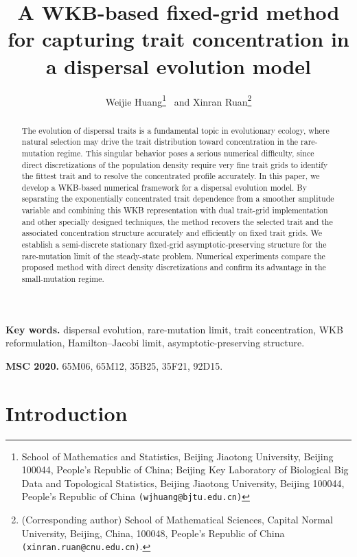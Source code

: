 \documentclass[11pt]{article}
\title{A WKB-based fixed-grid method for capturing trait concentration in a dispersal evolution model}
\author{
Weijie Huang\thanks{School of Mathematics and Statistics, Beijing Jiaotong University, Beijing 100044, People's Republic of China; Beijing Key Laboratory of Biological Big Data and Topological Statistics, Beijing Jiaotong University, Beijing 100044, People's Republic of China {\tt (wjhuang@bjtu.edu.cn)}} \ and
Xinran Ruan\thanks{(Corresponding author) School of Mathematical Sciences, Capital Normal University, Beijing, China, 100048, People's Republic of China {\tt (xinran.ruan@cnu.edu.cn)}.}
}
\numberwithin{equation}{section}
\begin{document}
\date{}
\maketitle

\begin{abstract}
The evolution of dispersal traits is a fundamental topic in evolutionary ecology, 
where natural selection may drive the trait distribution toward concentration in the rare-mutation regime. 
This singular behavior poses a serious numerical difficulty, 
since direct discretizations of the population density require very fine trait grids to identify the fittest trait and to resolve the concentrated profile accurately. 
In this paper, we develop a WKB-based numerical framework for a dispersal evolution model. 
By separating the exponentially concentrated trait dependence from a smoother
amplitude variable and combining this WKB representation with dual trait-grid implementation and other specially designed techniques, the method recovers the selected trait and
the associated concentration structure accurately and efficiently on fixed trait grids. 
We establish a semi-discrete stationary fixed-grid asymptotic-preserving structure for the rare-mutation limit of the steady-state problem.
Numerical experiments compare the proposed method with
direct density discretizations and confirm its advantage in the small-mutation
regime.
\end{abstract}

{\bf Key words. } dispersal evolution, rare-mutation limit, trait concentration, WKB reformulation, Hamilton--Jacobi limit, asymptotic-preserving structure.

{\bf MSC 2020. } 65M06, 65M12, 35B25, 35F21, 92D15.


\section{Introduction}
\end{document}
